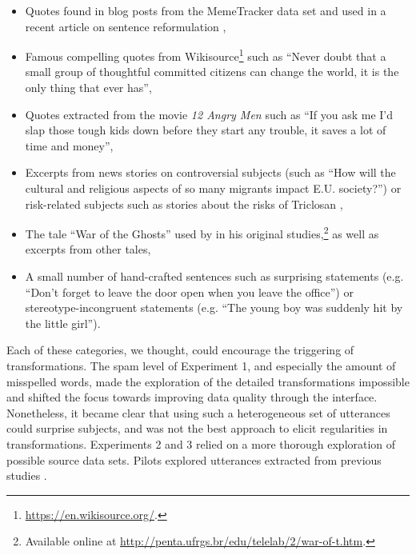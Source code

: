 \begin{itemize}
\item
  Quotes found in blog posts from the MemeTracker data set \autocite{leskovec_meme-tracking_2009} and used in a recent article on sentence reformulation \autocite{lerique-2018-semantic-drift},
\item
  Famous compelling quotes from Wikisource\footnote{\url{https://en.wikisource.org/}.}
  such as \enquote{Never doubt that a small group of thoughtful
  committed citizens can change the world, it is the only thing that
  ever has},
\item
  Quotes extracted from the movie \emph{12 Angry Men} such as
  \enquote{If you ask me I'd slap those tough kids down before they
  start any trouble, it saves a lot of time and money},
\item
  Excerpts from news stories on controversial subjects (such as
  \enquote{How will the cultural and religious aspects of so many
  migrants impact E.U. society?}) or risk-related subjects such as
  stories about the risks of Triclosan \autocite%
{moussaid_amplification_2015},
\item
  The tale \enquote{War of the Ghosts} used by
  \textcite{bartlett_remembering:_1995} in his original
  studies,\footnote{Available online at
    \url{http://penta.ufrgs.br/edu/telelab/2/war-of-t.htm}.} as well as
  excerpts from other tales,
\item
  A small number of hand-crafted sentences such as surprising statements
  (\hbox{e.g.} \enquote{Don't forget to leave the door open when you leave the
  office}) or stereotype-incongruent statements (\hbox{e.g.} \enquote{The young
  boy was suddenly hit by the little girl}).
\end{itemize}

Each of these categories, we thought, could encourage the triggering of
transformations. The spam level of Experiment 1, and especially the
amount of misspelled words, made the exploration of the detailed
transformations impossible and shifted the focus towards improving data
quality through the interface. Nonetheless, it became clear that using
such a heterogeneous set of utterances could surprise subjects, and was
not the best approach to elicit regularities in transformations.
Experiments 2 and 3 relied on a more thorough exploration of possible
source data sets. Pilots explored utterances extracted from previous
studies \autocites[ on personification and increased
stereotypes]{bangerter_transformation_2000}[ on the role of
disgust]{heath_emotional_2001}[ on incoherent
stories]{maxwell_remembering_1936}[ for the role of social
information]{mesoudi_bias_2006}.

